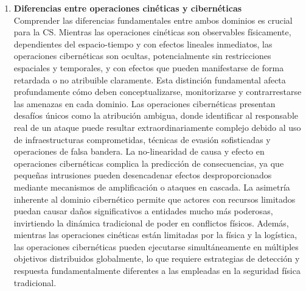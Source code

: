\begin{enumerate}
\item \textbf{Diferencias entre operaciones cinéticas y cibernéticas} \\
Comprender las diferencias fundamentales entre ambos dominios es crucial para la CS. Mientras las operaciones cinéticas son observables físicamente, dependientes del espacio-tiempo y con efectos lineales inmediatos, las operaciones cibernéticas son ocultas, potencialmente sin restricciones espaciales y temporales, y con efectos que pueden manifestarse de forma retardada o no atribuible claramente. Esta distinción fundamental afecta profundamente cómo deben conceptualizarse, monitorizarse y contrarrestarse las amenazas en cada dominio. Las operaciones cibernéticas presentan desafíos únicos como la atribución ambigua, donde identificar al responsable real de un ataque puede resultar extraordinariamente complejo debido al uso de infraestructuras comprometidas, técnicas de evasión sofisticadas y operaciones de falsa bandera. La no-linearidad de causa y efecto en operaciones cibernéticas complica la predicción de consecuencias, ya que pequeñas intrusiones pueden desencadenar efectos desproporcionados mediante mecanismos de amplificación o ataques en cascada. La asimetría inherente al dominio cibernético permite que actores con recursos limitados puedan causar daños significativos a entidades mucho más poderosas, invirtiendo la dinámica tradicional de poder en conflictos físicos. Además, mientras las operaciones cinéticas están limitadas por la física y la logística, las operaciones cibernéticas pueden ejecutarse simultáneamente en múltiples objetivos distribuidos globalmente, lo que requiere estrategias de detección y respuesta fundamentalmente diferentes a las empleadas en la seguridad física tradicional.
\end{enumerate}

